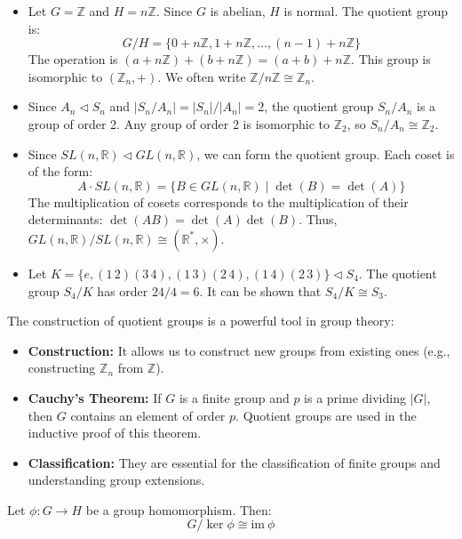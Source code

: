 \begin{example}
\begin{itemize}
    \item Let $G = \mathbb{Z}$ and $H = n\mathbb{Z}$. Since $G$ is abelian, $H$ is normal. The quotient group is:
    \[ G/H = \{ 0 + n\mathbb{Z}, 1 + n\mathbb{Z}, \dots, (n-1) + n\mathbb{Z} \} \]
    The operation is $(a + n\mathbb{Z}) + (b + n\mathbb{Z}) = (a+b) + n\mathbb{Z}$. This group is isomorphic to $(\mathbb{Z}_n, +)$. We often write $\mathbb{Z}/n\mathbb{Z} \cong \mathbb{Z}_n$.
    
    \item Since $A_n \triangleleft S_n$ and $|S_n/A_n| = |S_n|/|A_n| = 2$, the quotient group $S_n/A_n$ is a group of order 2. Any group of order 2 is isomorphic to $\mathbb{Z}_2$, so $S_n/A_n \cong \mathbb{Z}_2$.
    
    \item Since $SL(n, \mathbb{R}) \triangleleft GL(n, \mathbb{R})$, we can form the quotient group. Each coset is of the form:
    \[ A \cdot SL(n, \mathbb{R}) = \{ B \in GL(n, \mathbb{R}) \mid \det(B) = \det(A) \} \]
    The multiplication of cosets corresponds to the multiplication of their determinants: $\det(AB) = \det(A)\det(B)$. Thus, $GL(n, \mathbb{R})/SL(n, \mathbb{R}) \cong (\mathbb{R}^*, \times)$.
    
    \item Let $K = \{ e, (1\,2)(3\,4), (1\,3)(2\,4), (1\,4)(2\,3) \} \triangleleft S_4$. The quotient group $S_4/K$ has order $24/4 = 6$. It can be shown that $S_4/K \cong S_3$.
\end{itemize}
\end{example}

The construction of quotient groups is a powerful tool in group theory:
\begin{itemize}
    \item \textbf{Construction:} It allows us to construct new groups from existing ones (e.g., constructing $\mathbb{Z}_n$ from $\mathbb{Z}$).
    \item \textbf{Cauchy's Theorem:} If $G$ is a finite group and $p$ is a prime dividing $|G|$, then $G$ contains an element of order $p$. Quotient groups are used in the inductive proof of this theorem.
    \item \textbf{Classification:} They are essential for the classification of finite groups and understanding group extensions.
\end{itemize}

\begin{theorem}
Let $\phi : G \to H$ be a group homomorphism. Then:
\[ G/\ker \phi \cong \mathrm{im }\ \phi \]
\end{theorem}

